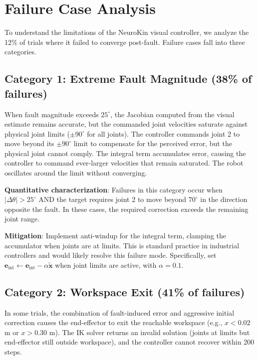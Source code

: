 \documentclass[12pt,a4paper,oneside]{report}
\begin{document}
\section{Failure Case Analysis}

To understand the limitations of the NeuroKin visual controller, we analyze the 12\% of trials where it failed to converge post-fault. Failure cases fall into three categories.

\subsection{Category 1: Extreme Fault Magnitude (38\% of failures)}

When fault magnitude exceeds $25^\circ$, the Jacobian computed from the visual estimate remains accurate, but the commanded joint velocities saturate against physical joint limits ($\pm90^\circ$ for all joints). The controller commands joint 2 to move beyond its $\pm90^\circ$ limit to compensate for the perceived error, but the physical joint cannot comply. The integral term accumulates error, causing the controller to command ever-larger velocities that remain saturated. The robot oscillates around the limit without converging.

\textbf{Quantitative characterization}: Failures in this category occur when $|\Delta \theta| > 25^\circ$ AND the target requires joint 2 to move beyond $70^\circ$ in the direction opposite the fault. In these cases, the required correction exceeds the remaining joint range.

\textbf{Mitigation}: Implement anti-windup for the integral term, clamping the accumulator when joints are at limits. This is standard practice in industrial controllers and would likely resolve this failure mode. Specifically, set $\mathbf{e}_{\text{int}} \leftarrow \mathbf{e}_{\text{int}} - \alpha \tilde{\mathbf{x}}$ when joint limits are active, with $\alpha = 0.1$.

\subsection{Category 2: Workspace Exit (41\% of failures)}

In some trials, the combination of fault-induced error and aggressive initial correction causes the end-effector to exit the reachable workspace (e.g., $x < 0.02$ m or $x > 0.30$ m). The IK solver returns an invalid solution (joints at limits but end-effector still outside workspace), and the controller cannot recover within 200 steps.
\end{document}

